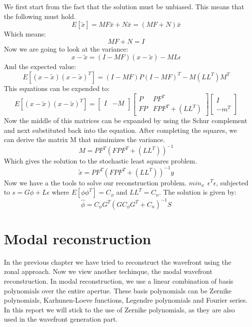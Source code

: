 \documentclass{article}
\begin{document}
We first start from the fact that the solution must be unbiased. This means that the following must hold.
$$ E[\tilde{x}]=MF\bar{x} + N\bar{x}=(MF+N)\bar{x}$$
Which means:
$$MF+N=I$$  
Now we are going to look at the variance:
$$x-\tilde{x}=(I-MF)(x-\tilde{x})-ML\epsilon$$
And the expected value:
$$ E[(x-\tilde{x})(x-\tilde{x})^T] = (I-MF)P(I-MF)^T - M(LL^T)M^T$$
This equations can be expended to:
$$ E[(x-\tilde{x})(x-\tilde{x})^T] =
\begin{bmatrix}
I & -M \\
\end{bmatrix}
\begin{bmatrix}
P  & PF^T \\
FP & FPF^T+(LL^T)
\end{bmatrix}
\begin{bmatrix}
I  \\
-m^T
\end{bmatrix}
$$ 
Now the middle of this matrices can be expanded by using the Schur complement and next substituted back into the equation. After completing the squares, we can derive the matrix M that mimimizes the variance.
$$ M = PF^T(FPF^T+(LL^T))^{-1}$$
Which gives the solution to the stochastic least squares problem.
$$\tilde{x} = PF^T(FPF^T+(LL^T))^{-1}y$$
Now we have a the tools to solve our reconstruction problem.
\newline
\newline
$ min_x \ \ \epsilon^T \epsilon $, subjected to $ s=G\phi + L\epsilon$
\newline
\newline
where $E[\phi\phi^T]=C_\phi$ and $LL^T=C_n$. The solution is given by:
$$\hat{\phi} = C_\phi G^T(GC_\phi G^T + C_n)^{-1}S $$

\newpage
\section{Modal reconstruction}
In the previous chapter we have tried to reconstruct the wavefront using the zonal approach. Now we view another techinque, the modal wavefront reconstruction. In modal reconstruction, we use a linear combination of basis polynomials over the entire apertue. These basis polynomials can be Zernike polynomials, Karhunen-Loeve functions, Legendre polynomials and Fourier series. In this report we will stick to the use of Zernike polynomials, as they are also used in the wavefront generation part. 
\end{document}
